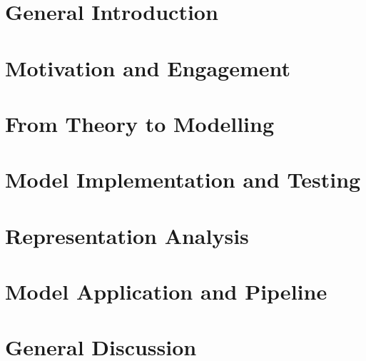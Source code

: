 \documentclass{yorkThesis}
\begin{document}
\contents


\chapter*{General Introduction}
\label{chapter_general_intro}


\chapter{Motivation and Engagement}
\label{chapter_lit_review}


\chapter{From Theory to Modelling}
\label{chapter_theory_modelling}


\chapter{Model Implementation and Testing}
\label{chapter_implementation_testing}


\chapter{Representation Analysis}
\label{chapter_repr_anal}


\chapter{Model Application and Pipeline}
\label{chapter_appliction}


\chapter{General Discussion}
\label{chapter_general_discussion}





\appendix




\end{document}
